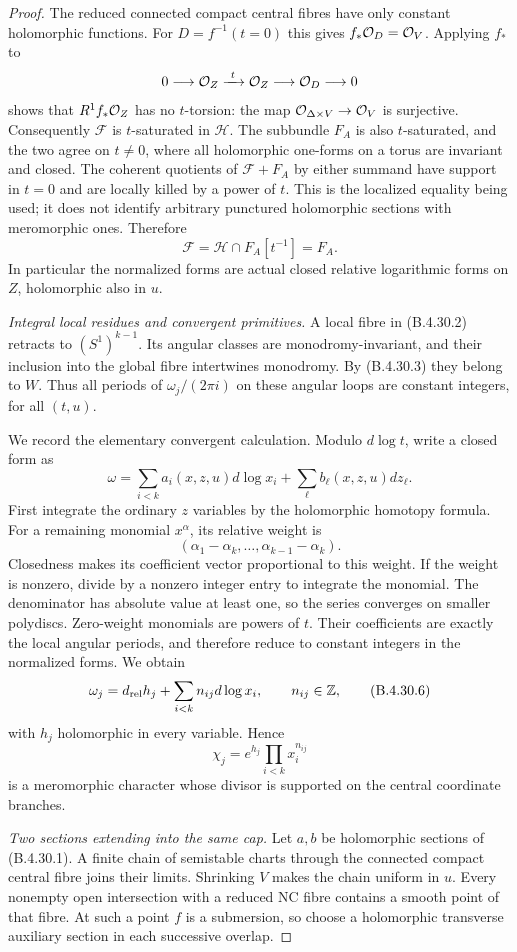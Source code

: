 \begin{proof}
The reduced connected compact central fibres
have only constant holomorphic functions.
For $D=f^{-1}(t=0)$ this gives
$f_*\mathcal O_D=\mathcal O_V$. Applying $f_*$ to
\[
 0\longrightarrow\mathcal O_Z\xrightarrow{\ t\ }
 \mathcal O_Z\longrightarrow\mathcal O_D\longrightarrow0
\]
shows that $R^1f_*\mathcal O_Z$ has no $t$-torsion:
the map $\mathcal O_{\Delta\times V}\to\mathcal O_V$ is
surjective. Consequently $\mathcal F$ is
$t$-saturated in $\mathcal H$. The subbundle
$F_A$ is also $t$-saturated, and the two agree
on $t\ne0$, where all holomorphic one-forms
on a torus are invariant and closed. The
coherent quotients of $\mathcal F+F_A$ by
either summand have support in $t=0$ and
are locally killed by a power of $t$. This
is the localized equality being used; it
does not identify arbitrary punctured
holomorphic sections with meromorphic ones.
Therefore
\[
 \mathcal F=\mathcal H\cap F_A[t^{-1}]=F_A.
 \tag{B.4.30.5}
\]
In particular the normalized forms are actual
closed relative logarithmic forms on $Z$,
holomorphic also in $u$.

\emph{Integral local residues and convergent primitives.}
A local fibre in (B.4.30.2) retracts to
$(S^1)^{k-1}$. Its angular classes are
monodromy-invariant, and their inclusion into
the global fibre intertwines monodromy. By
(B.4.30.3) they belong to $W$. Thus all periods
of $\omega_j/(2\pi i)$ on these angular loops
are constant integers, for all $(t,u)$.

We record the elementary convergent calculation.
Modulo $d\log t$, write a closed form as
\[
 \omega=\sum_{i<k}a_i(x,z,u)d\log x_i
                   +\sum_\ell b_\ell(x,z,u)dz_\ell.
\]
First integrate the ordinary $z$ variables by
the holomorphic homotopy formula. For a
remaining monomial $x^\alpha$, its relative
weight is
\[
 (\alpha_1-\alpha_k,\ldots,\alpha_{k-1}-\alpha_k).
\]
Closedness makes its coefficient vector
proportional to this weight. If the weight is
nonzero, divide by a nonzero integer entry to
integrate the monomial. The denominator has
absolute value at least one, so the series
converges on smaller polydiscs. Zero-weight
monomials are powers of $t$. Their coefficients
are exactly the local angular periods, and
therefore reduce to constant integers in the
normalized forms. We obtain
\[
 \omega_j=d_{\rm rel}h_j+
               \sum_{i<k}n_{ij}d\log x_i,
 \qquad n_{ij}\in\mathbb Z,
 \tag{B.4.30.6}
\]
with $h_j$ holomorphic in every variable.
Hence
\[
 \chi_j=e^{h_j}\prod_{i<k}x_i^{n_{ij}}
 \tag{B.4.30.7}
\]
is a meromorphic character whose divisor is
supported on the central coordinate branches.

\emph{Two sections extending into the same cap.}
Let $a,b$ be holomorphic sections of (B.4.30.1).
A finite chain of semistable charts through the
connected compact central fibre joins their
limits. Shrinking $V$ makes the chain uniform
in $u$. Every nonempty open intersection with
a reduced NC fibre contains a smooth point of
that fibre. At such a point $f$ is a
submersion, so choose a holomorphic transverse
auxiliary section in each successive overlap.


\end{proof}
